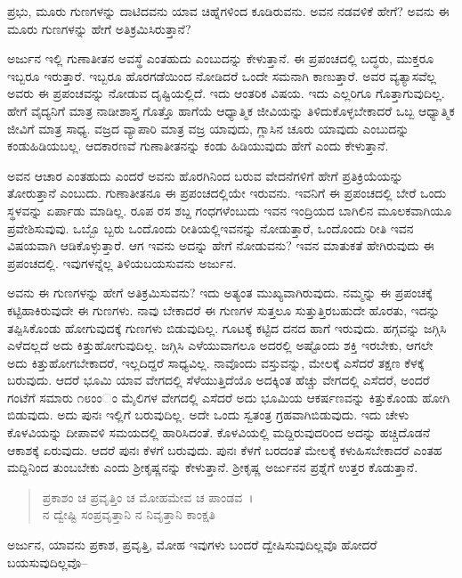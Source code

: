 {\small ಪ್ರಭು, ಮೂರು ಗುಣಗಳನ್ನು ದಾಟಿದವನು ಯಾವ ಚಿಹ್ನೆಗಳಿಂದ ಕೂಡಿರುವನು. ಅವನ ನಡವಳಿಕೆ ಹೇಗೆ? ಅವನು ಈ ಮೂರು ಗುಣಗಳನ್ನು ಹೇಗೆ ಅತಿಕ್ರಮಿಸಿರುತ್ತಾನೆ?}

ಅರ್ಜುನ ಇಲ್ಲಿ ಗುಣಾತೀತನ ಅವಸ್ಥೆ ಎಂತಹುದು ಎಂಬುದನ್ನು ಕೇಳುತ್ತಾನೆ. ಈ ಪ್ರಪಂಚದಲ್ಲಿ ಬದ್ಧರು, ಮುಕ್ತರೂ ಇಬ್ಬರೂ ಇರುತ್ತಾರೆ. ಇಬ್ಬರೂ ಹೊರಗಡೆಯಿಂದ ನೋಡಿದರೆ ಒಂದೇ ಸಮನಾಗಿ ಕಾಣುತ್ತಾರೆ. ಅವರ ವ್ಯತ್ಯಾಸವೆಲ್ಲ ಅವರು ಈ ಪ್ರಪಂಚವನ್ನು ನೋಡುವ ದೃಷ್ಟಿಯಲ್ಲಿದೆ. ಇದು ಆಂತರಿಕ ವಿಷಯ. ಇದು ಎಲ್ಲರಿಗೂ ಗೊತ್ತಾಗುವುದಿಲ್ಲ. ಹೇಗೆ ವೈದ್ಯನಿಗೆ ಮಾತ್ರ ನಾಡೀಶಾಸ್ತ್ರ ಗೊತ್ತೊ ಹಾಗೆಯೆ ಆಧ್ಯಾತ್ಮಿಕ ಜೀವಿಯನ್ನು ತಿಳಿದುಕೊಳ್ಳಬೇಕಾದರೆ ಒಬ್ಬ ಆಧ್ಯಾತ್ಮಿಕ ಜೀವಿಗೆ ಮಾತ್ರ ಸಾಧ್ಯ. ವಜ್ರದ ವ್ಯಾಪಾರಿ ಮಾತ್ರ ವಜ್ರ ಯಾವುದು, ಗ್ಲಾಸಿನ ಚೂರು ಯಾವುದು ಎಂಬುದನ್ನು ಕಂಡುಹಿಡಿಯಬಲ್ಲ. ಆದಕಾರಣವೆ ಗುಣಾತೀತನನ್ನು ಕಂಡು ಹಿಡಿಯುವುದು ಹೇಗೆ ಎಂದು ಕೇಳುತ್ತಾನೆ.

ಅವನ ಆಚಾರ ಎಂತಹುದು ಎಂದರೆ ಅವನು ಹೊರಗಿನಿಂದ ಬರುವ ವೇದನೆಗಳಿಗೆ ಹೇಗೆ ಪ್ರತಿಕ್ರಿಯೆಯನ್ನು ತೋರುತ್ತಾನೆ ಎಂಬುದು. ಗುಣಾತೀತನೂ ಈ ಪ್ರಪಂಚದಲ್ಲಿಯೇ ಇರುವನು. ಇವನಿಗೆ ಈ ಪ್ರಪಂಚದಲ್ಲಿ ಬೇರೆ ಒಂದು ಸ್ಥಳವನ್ನು ಏರ್ಪಾಡು ಮಾಡಿಲ್ಲ. ರೂಪ ರಸ ಶಬ್ದ ಗಂಧಗಳೆಂಬುದು ಇವನ ಇಂದ್ರಿಯದ ಬಾಗಿಲಿನ ಮೂಲಕವಾಗಿಯೂ ಪ್ರವೇಶಿಸುವುವು. ಒಬ್ಬೊ ಬ್ಬರು ಒಂದೊಂದು ರೀತಿಯಲ್ಲಿಇವನನ್ನು ನೋಡುತ್ತಾರೆ, ಒಂದೊಂದು ರೀತಿ ಇವನ ವಿಷಯವಾಗಿ ಆಡಿಕೊಳ್ಳುತ್ತಾರೆ. ಆಗ ಇವನು ಅದನ್ನು ಹೇಗೆ ನೋಡುವನು? ಇವನ ಮಾತುಕತೆ ಹೇಗಿರುವುದು ಈ ಪ್ರಪಂಚದಲ್ಲಿ. ಇವುಗಳನ್ನೆಲ್ಲ ತಿಳಿಯಬಯಸುವನು ಅರ್ಜುನ.

ಅವನು ಈ ಗುಣಗಳನ್ನು ಹೇಗೆ ಅತಿಕ್ರಮಿಸುವನು? ಇದು ಅತ್ಯಂತ ಮುಖ್ಯವಾಗಿರುವುದು. ನಮ್ಮನ್ನು ಈ ಪ್ರಪಂಚಕ್ಕೆ ಕಟ್ಟಿಹಾಕಿರುವುದೇ ಈ ಗುಣಗಳು. ನಾವು ಬೇಕಾದರೆ ಈ ಗುಣಗಳ ಸುತ್ತಲೂ ಸುತ್ತುತ್ತಿರಬಹುದೇ ಹೊರತು, ಇದನ್ನು ತಪ್ಪಿಸಿಕೊಂಡು ಹೋಗುವುದಕ್ಕೆ ಗುಣಗಳು ಬಿಡುವುದಿಲ್ಲ. ಗೂಟಕ್ಕೆ ಕಟ್ಟಿದ ದನದ ಹಾಗೆ ಇರುವುದು. ಹಗ್ಗವನ್ನು ಜಗ್ಗಿಸಿ ಎಳೆದಲ್ಲದೆ ಅದು ಕಿತ್ತುಹೋಗುವುದಿಲ್ಲ. ಜಗ್ಗಿಸಿ ಎಳೆಯುವಾಗಲೂ ಅದರಲ್ಲಿ ಅಷ್ಟೊಂದು ಶಕ್ತಿ ಇರಬೇಕು, ಆಗಲೇ ಅದು ಕಿತ್ತುಹೋಗಬೇಕಾದರೆ, ಇಲ್ಲದಿದ್ದರೆ ಸಾಧ್ಯವಿಲ್ಲ. ನಾವೊಂದು ವಸ್ತುವನ್ನು, ಮೇಲಕ್ಕೆ ಎಸೆದರೆ ತಕ್ಷಣ ಕೆಳಕ್ಕೆ ಬರುವುದು. ಆದರೆ ಭೂಮಿ ಯಾವ ವೇಗದಲ್ಲಿ ಸೆಳೆಯುತ್ತಿದೆಯೊ ಅದಕ್ಕಿಂತ ಹೆಚ್ಚು ವೇಗದಲ್ಲಿ ಎಸೆದರೆ, ಅಂದರೆ ಗಂಟೆಗೆ ಸಮಾರು ೧೮ಂಂಂ ಮೈಲಿಗಳ ವೇಗದಲ್ಲಿ ಎಸೆದರೆ ಅದು ಭೂಮಿಯ ಆಕರ್ಷಣವನ್ನು ಕಿತ್ತುಕೊಂಡು ಹೋಗಿ ಬಿಡುವುದು. ಅದು ಪುನಃ ಇಲ್ಲಿಗೆ ಬರುವುದಿಲ್ಲ. ಅದೇ ಒಂದು ಸ್ವತಂತ್ರ ಗ್ರಹವಾಗಿಬಿಡುವುದು. ಇದು ಚೇಳು ಕೊಳವಿಯನ್ನು ದೀಪಾವಳಿ ಸಮಯದಲ್ಲಿ ಹಾರಿಸಿದಂತೆ. ಕೊಳವಿಯಲ್ಲಿ ಮದ್ದಿರುವುದರಿಂದ ಅದನ್ನು ಹಚ್ಚಿದೊಡನೆ ಆಕಾಶಕ್ಕೆ ಏರುವುದು. ಆದರೆ ಪುನಃ ಕೆಳಗೆ ಬರುವುದು. ಪುನಃ ಕೆಳಗೆ ಬರದಂತೆ ಮೇಲಕ್ಕೆ ಕಳುಹಿಸಬೇಕಾದರೆ ಎಂತಹ ಮದ್ದಿನಿಂದ ತುಂಬಬೇಕು ಎಂದು ಶ‍್ರೀಕೃಷ್ಣನನ್ನು ಕೇಳುತ್ತಾನೆ. ಶ‍್ರೀಕೃಷ್ಣ ಅರ್ಜುನನ ಪ್ರಶ್ನೆಗೆ ಉತ್ತರ ಕೊಡುತ್ತಾನೆ.

\begin{verse}
ಪ್ರಕಾಶಂ ಚ ಪ್ರವೃತ್ತಿಂ ಚ ಮೋಹಮೇವ ಚ ಪಾಂಡವ~।\\ನ ದ್ವೇಷ್ಟಿ ಸಂಪ್ರವೃತ್ತಾನಿ ನ ನಿವೃತ್ತಾನಿ ಕಾಂಕ್ಷತಿ 
\end{verse}

{\small ಅರ್ಜುನ, ಯಾವನು ಪ್ರಕಾಶ, ಪ್ರವೃತ್ತಿ, ಮೋಹ ಇವುಗಳು ಬಂದರೆ ದ್ವೇಷಿಸುವುದಿಲ್ಲವೊ ಹೋದರೆ ಬಯಸುವುದಿಲ್ಲವೊ--}

